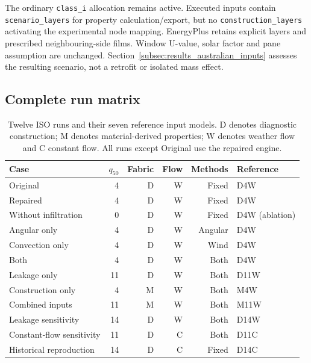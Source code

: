 The ordinary \nolinkurl{class_i} allocation remains active. Executed inputs contain \nolinkurl{scenario_layers} for property calculation/export, but no \nolinkurl{construction_layers} activating the experimental node mapping. EnergyPlus retains explicit layers and prescribed neighbouring-side films. Window U-value, solar factor and pane assumption are unchanged. Section~\ref{subsec:results_australian_inputs} assesses the resulting scenario, not a retrofit or isolated mass effect.

\subsection{Complete run matrix}
\label{app:runs}
\begin{table}[H]\centering\scriptsize
\caption{Twelve ISO runs and their seven reference input models. D denotes diagnostic construction; M denotes material-derived properties; W denotes weather flow and C constant flow. All runs except Original use the repaired engine.}\label{tab:runs}
\begin{tabularx}{\linewidth}{@{}YrrrrY@{}}\toprule
Case & $q_{50}$ & Fabric & Flow & Methods & Reference\\\midrule
Original & 4 & D & W & Fixed & D4W\\
Repaired & 4 & D & W & Fixed & D4W\\
Without infiltration & 0 & D & W & Fixed & D4W (ablation)\\
Angular only & 4 & D & W & Angular & D4W\\
Convection only & 4 & D & W & Wind & D4W\\
Both & 4 & D & W & Both & D4W\\
Leakage only & 11 & D & W & Both & D11W\\
Construction only & 4 & M & W & Both & M4W\\
Combined inputs & 11 & M & W & Both & M11W\\
Leakage sensitivity & 14 & D & W & Both & D14W\\
Constant-flow sensitivity & 11 & D & C & Both & D11C\\
Historical reproduction & 14 & D & C & Fixed & D14C\\\bottomrule
\end{tabularx}\end{table}
